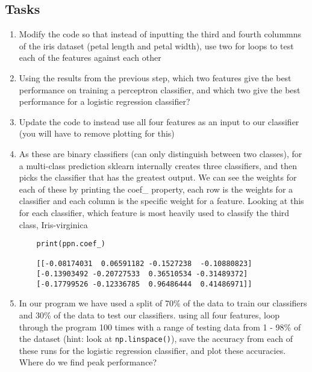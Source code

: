 \documentclass[12pt]{article}
\def\code#1{\texttt{#1}} %
\begin{document}
\subsection{Tasks}
\begin{enumerate}
\item Modify the code so that instead of inputting the third and fourth colummns of the iris dataset (petal length and petal width), use two for loops to test each of the features against each other 



\item Using the results from the previous step, which two features give the best performance on training a perceptron classifier, and which two give the best performance for a logistic regression classifier?

\item Update the code to instead use all four features as an input to our classifier (you will have to remove plotting for this)

\item As these are binary classifiers (can only distinguish between two classes), for a multi-class prediction sklearn internally creates three classifiers, and then picks the classifier that has the greatest output. We can see the weights for each of these by printing the coef\_ property, each row is the weights for a classifier and each column is the specific weight for a feature. Looking at this for each classifier, which feature is most heavily used to classify the third class, Iris-virginica
\begin{verbatim}
    print(ppn.coef_)

    [[-0.08174031  0.06591182 -0.1527238  -0.10880823]
    [-0.13903492 -0.20727533  0.36510534 -0.31489372]
    [-0.17799526 -0.12336785  0.96486444  0.41486971]]
\end{verbatim}


\item In our program we have used a split of 70\% of the data to train our classifiers and 30\% of the data to test our classifiers. using all four features, loop through the program 100 times with a range of testing data from 1 - 98\% of the dataset (hint: look at \code{np.linspace()}), save the accuracy from each of these runs for the logistic regression classifier, and plot these accuracies. Where do we find peak performance?


\end{enumerate}
\end{document}
